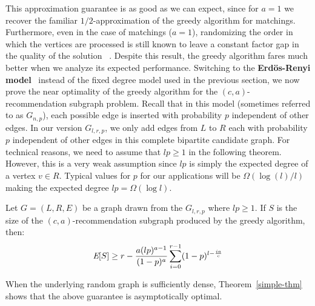 This approximation guarantee is as good as we can expect,
since for $a=1$ we recover the familiar $1/2$-approximation
of the greedy algorithm for matchings. Furthermore, even in the case of matchings ($a=1$),
randomizing the order in which the vertices are processed is still
known to leave a constant factor gap in the quality of the solution
~\cite{KarpVaziraniVazirani1990}. Despite this result, the greedy
algorithm fares much better when we analyze its expected performance.
Switching to the
{\bf Erd\"{o}s-Renyi model}~\cite{ErdosRenyi59} instead of the fixed degree model used in
the previous section, we now prove the near optimality of the
greedy algorithm for the $(c, a)$-recommendation subgraph problem.
Recall that in this model (sometimes referred to as $G_{n,p}$), each possible edge is inserted with probability $p$ independent of other edges. In our version $G_{l,r,p}$, we only add edges from $L$ to $R$ each with probability $p$ independent of other edges in this complete bipartite candidate graph.  For technical reasons, we need to assume that $lp \geq 1$ in the following theorem. However, this is a very weak assumption since $lp$ is simply the expected degree of a vertex $v\in R$. Typical values for $p$ for our applications will be $\Omega(\log(l)/l)$ making the expected degree $lp=\Omega(\log l)$.

\begin{thm}\label{greed-is-good}
Let $G=(L,R,E)$ be a graph drawn from the $G_{l,r,p}$ where $lp \geq 1$. If $S$ is the size of the $(c,a)$-recommendation subgraph produced by the greedy algorithm, then:
\[ \emph{\text{E}}[S] \geq r - \frac{a(lp)^{a-1}}{(1-p)^a} \sum_{i=0}^{r-1}(1-p)^{l-\frac{ia}{c}}\]
\end{thm}

When the underlying random graph is sufficiently dense, Theorem~\ref{simple-thm} shows that the above guarantee is asymptotically optimal. \vs

